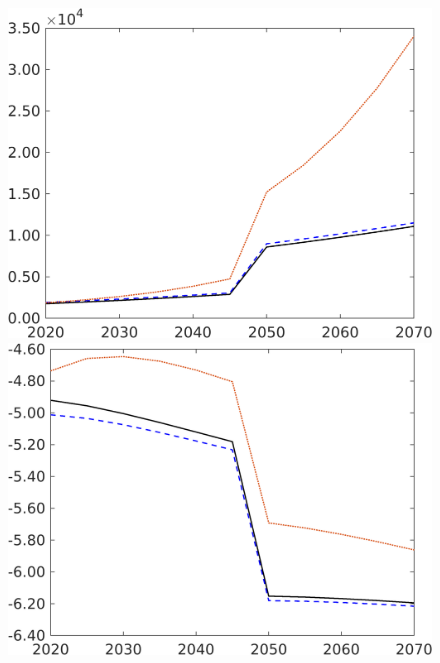 \begin{figure}[h!!!]
\begin{minipage}[]{0.32\textwidth}
	\end{minipage}
	\begin{minipage}[]{0.32\textwidth}
		\includegraphics[width=1\textwidth]{../../codding_model/own_basedOnFried/optimalPol_190722_tidiedUp/figures/all_10Aout22/LgLf_PercentageLfDynNT_Target_regime3_spillover0_noskill0_sep1_xgrowth0_PV1_etaa0.79_lgd0.png}
	\end{minipage}
\begin{minipage}[]{0.32\textwidth}
	\includegraphics[width=1\textwidth]{../../codding_model/own_basedOnFried/optimalPol_190722_tidiedUp/figures/all_10Aout22/EY_PercentageLfDynNT_Target_regime3_spillover0_noskill0_sep1_xgrowth0_PV1_etaa0.79_lgd0.png}

\end{minipage}
\end{figure}

